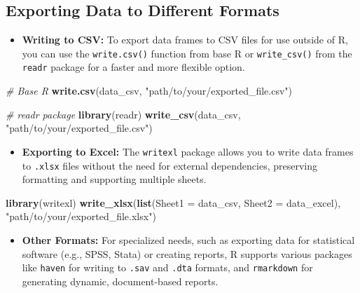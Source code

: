 \documentclass[
]{book}
\newenvironment{Shaded}{\begin{snugshade}}{\end{snugshade}}
\newcommand{\AttributeTok}[1]{\textcolor[rgb]{0.13,0.29,0.53}{#1}}
\newcommand{\CommentTok}[1]{\textcolor[rgb]{0.56,0.35,0.01}{\textit{#1}}}
\newcommand{\FunctionTok}[1]{\textcolor[rgb]{0.13,0.29,0.53}{\textbf{#1}}}
\newcommand{\NormalTok}[1]{#1}
\newcommand{\StringTok}[1]{\textcolor[rgb]{0.31,0.60,0.02}{#1}}
\providecommand{\tightlist}{%
  \setlength{\itemsep}{0pt}\setlength{\parskip}{0pt}}
\begin{document}
\hypertarget{exporting-data-to-different-formats}{%
\subsection*{Exporting Data to Different Formats}\label{exporting-data-to-different-formats}}

\begin{itemize}
\tightlist
\item
  \textbf{Writing to CSV:} To export data frames to CSV files for use outside of R, you can use the \texttt{write.csv()} function from base R or \texttt{write\_csv()} from the \texttt{readr} package for a faster and more flexible option.
\end{itemize}

\begin{Shaded}
\begin{Highlighting}[]
\CommentTok{\# Base R}
\FunctionTok{write.csv}\NormalTok{(data\_csv, }\StringTok{"path/to/your/exported\_file.csv"}\NormalTok{)}

\CommentTok{\# readr package}
\FunctionTok{library}\NormalTok{(readr)}
\FunctionTok{write\_csv}\NormalTok{(data\_csv, }\StringTok{"path/to/your/exported\_file.csv"}\NormalTok{)}
\end{Highlighting}
\end{Shaded}

\begin{itemize}
\tightlist
\item
  \textbf{Exporting to Excel:} The \texttt{writexl} package allows you to write data frames to \texttt{.xlsx} files without the need for external dependencies, preserving formatting and supporting multiple sheets.
\end{itemize}

\begin{Shaded}
\begin{Highlighting}[]
\FunctionTok{library}\NormalTok{(writexl)}
\FunctionTok{write\_xlsx}\NormalTok{(}\FunctionTok{list}\NormalTok{(}\AttributeTok{Sheet1 =}\NormalTok{ data\_csv, }\AttributeTok{Sheet2 =}\NormalTok{ data\_excel), }\StringTok{"path/to/your/exported\_file.xlsx"}\NormalTok{)}
\end{Highlighting}
\end{Shaded}

\begin{itemize}
\tightlist
\item
  \textbf{Other Formats:} For specialized needs, such as exporting data for statistical software (e.g., SPSS, Stata) or creating reports, R supports various packages like \texttt{haven} for writing to \texttt{.sav} and \texttt{.dta} formats, and \texttt{rmarkdown} for generating dynamic, document-based reports.
\end{itemize}
\end{document}
